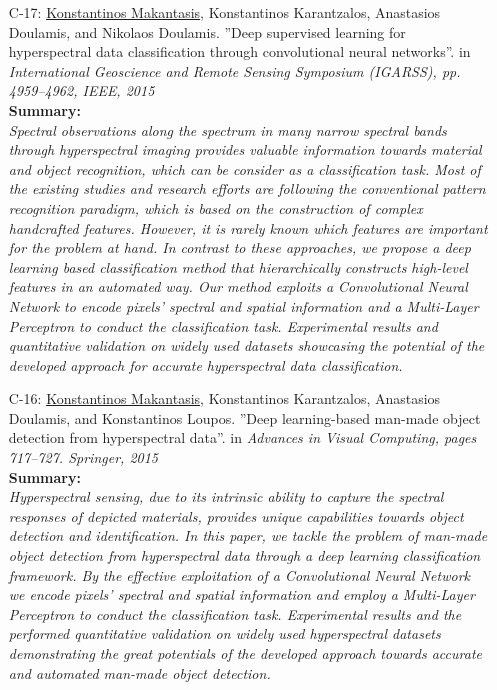 \documentclass[a4paper,10pt]{article}
\begin{document}
\begin{itemize}
	\item [C-17:]\underline{Konstantinos Makantasis}, Konstantinos Karantzalos, Anastasios Doulamis, and Nikolaos Doulamis. ''Deep supervised learning for hyperspectral data classification through convolutional neural networks''. in \textit{International Geoscience and Remote Sensing Symposium (IGARSS), pp. 4959–4962, IEEE, 2015}\\
	\textbf{Summary:}\\
	\textit{Spectral observations along the spectrum in many narrow spectral bands through hyperspectral imaging provides valuable information towards material and object recognition, which can be consider as a classification task. Most of the existing studies and research efforts are following the conventional pattern recognition paradigm, which is based on the construction of complex handcrafted features. However, it is rarely known which features are important for the problem at hand. In contrast to these approaches, we propose a deep learning based classification method that hierarchically constructs high-level features in an automated way. Our method exploits a Convolutional Neural Network to encode pixels' spectral and spatial information and a Multi-Layer Perceptron to conduct the classification task. Experimental results and quantitative validation on widely used datasets showcasing the potential of the developed approach for accurate hyperspectral data classification.}
	
	\item [C-16:]\underline{Konstantinos Makantasis}, Konstantinos Karantzalos, Anastasios Doulamis, and Konstantinos Loupos. ''Deep learning-based man-made object detection from hyperspectral data''. in \textit{Advances in Visual Computing, pages 717–727. Springer, 2015}\\
	\textbf{Summary:}\\
	\textit{Hyperspectral sensing, due to its intrinsic ability to capture the spectral responses of depicted materials, provides unique capabilities towards object detection and identification. In this paper, we tackle the problem of man-made object detection from hyperspectral data through a deep learning classification framework. By the effective exploitation of a Convolutional Neural Network we encode pixels’ spectral and spatial information and employ a Multi-Layer Perceptron to conduct the classification task. Experimental results and the performed quantitative validation on widely used hyperspectral datasets demonstrating the great potentials of the developed approach towards accurate and automated man-made object detection.}
	

\end{itemize}
\end{document}

